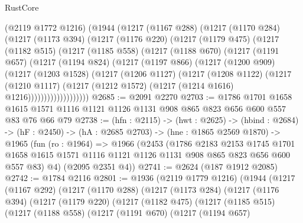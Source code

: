 \begin{lexlean}{RustCore}
\begin{coremodule}
    (@2119 @1772 @1216)
    (@1944
      (@1217
        (@1167 @288)
        (@1217
          (@1170 @284)
          (@1217
            (@1173 @394)
            (@1217
              (@1176 @220)
              (@1217
                (@1179 @475)
                (@1217
                  (@1182 @515)
                  (@1217
                    (@1185 @558)
                    (@1217
                      (@1188 @670)
                      (@1217
                        (@1191 @657)
                        (@1217
                          (@1194 @824)
                          (@1217
                            (@1197 @866)
                            (@1217
                              (@1200 @909)
                              (@1217
                                (@1203 @1528)
                                (@1217
                                  (@1206 @1127)
                                  (@1217
                                    (@1208 @1122)
                                    (@1217
                                      (@1210 @1117)
                                      (@1217
                                        (@1212 @1572)
                                        (@1217 (@1214 @1616) @1216)))))))))))))))))))
@2685 := @2091 @2270
@2703 := @1786
    @1701
    @1658
    @1615
    @1571
    @1116
    @1121
    @1126
    @1131
    @908
    @865
    @823
    @656
    @600
    @557
    @83
    @76
    @66
    @79
@2738 := (hfn : @2115) ->
  (hwt : @2625) ->
  (hbind : @2684) ->
  (hF : @2450) ->
  (hA : @2685 @2703) ->
  (hne : @1865 @2569 @1870) ->
  @1965
    (fun (ro : @1964) =>
    @1966
      (@2453
        (@1786
          @2183
          @2153
          @1745
          @1701
          @1658
          @1615
          @1571
          @1116
          @1121
          @1126
          @1131
          @908
          @865
          @823
          @656
          @600
          @557
          @83)
        @4)
      (@2095 @2351 @4))
@2741 := @2624 (@187 @1912 @2085)
@2742 := @1784 @2116
@2801 := @1936
    (@2119 @1779 @1216)
    (@1944
      (@1217
        (@1167 @292)
        (@1217
          (@1170 @288)
          (@1217
            (@1173 @284)
            (@1217
              (@1176 @394)
              (@1217
                (@1179 @220)
                (@1217
                  (@1182 @475)
                  (@1217
                    (@1185 @515)
                    (@1217
                      (@1188 @558)
                      (@1217
                        (@1191 @670)
                        (@1217
                          (@1194 @657)

\end{coremodule}
\end{lexlean}
